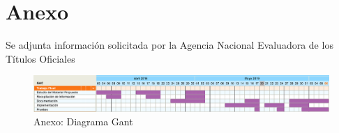 \documentclass[a4paper,11pt]{book}
\begin{document}
\chapter{Anexo}

Se adjunta información solicitada por la Agencia Nacional Evaluadora de los Títulos Oficiales

\begin{figure}[H]  
\centering 
\includegraphics[scale=0.25]{imagenes/gant.png}
\caption{ Anexo: Diagrama Gant}  
\end{figure} 



%
%
%
%

%
%

\thispagestyle{empty}
\end{document}
